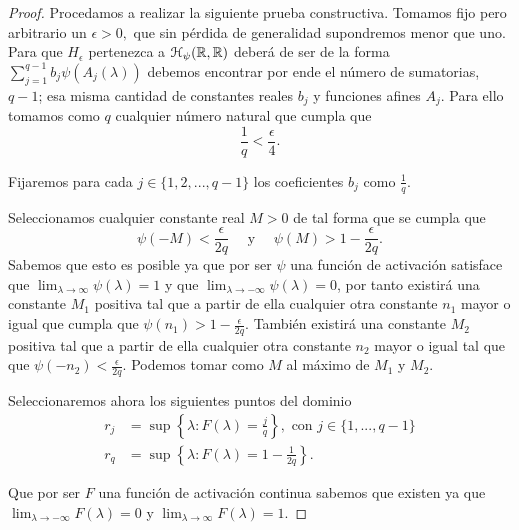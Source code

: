 \begin{proof}
    Procedamos a realizar la siguiente prueba constructiva. 
    Tomamos fijo pero arbitrario un $\epsilon > 0,$ que sin pérdida de generalidad
    supondremos menor que uno.
    Para que $H_\epsilon$ pertenezca a $\mathcal{H}_\psi{(\mathbb{R}, \mathbb{R})}$ deberá de ser de la 
    forma $\sum^{q-1}_{j=1} b_j \psi( A_j(\lambda))$
    debemos encontrar por ende el número de sumatorias, $q-1$; esa misma cantidad de constantes reales $b_j$ y 
    funciones afines $A_j$. Para ello tomamos como $q$ cualquier número natural que cumpla que 
    \begin{equation}\label{eq:lema_a_2_def_q}
        \frac{1}{q} < \frac{\epsilon}{4}.
    \end{equation}

    Fijaremos para cada $j \in \{1,2, ...,q-1\}$ los coeficientes  $b_j$ como $\frac{1}{q}$. 

    Seleccionamos cualquier constante real $M>0$ de tal forma que 
    se cumpla que
    \begin{equation}\label{lema_a_2_psi_m}
        \psi(-M) < \frac{\epsilon}{2q}
        \quad \text{ y } \quad
        \psi(M) > 1 - \frac{\epsilon}{2q}.
    \end{equation} 
    Sabemos que esto es posible ya que por ser $\psi$ una función de activación satisface que 
    $\lim_{\lambda \longrightarrow \infty} \psi(\lambda) = 1$ y que  $\lim_{\lambda \longrightarrow -\infty} \psi(\lambda) = 0$,
    por tanto existirá una constante $M_1$ positiva tal que a partir de ella cualquier
     otra constante $n_1$ mayor o igual que cumpla que 
    $\psi(n_1) > 1 - \frac{\epsilon}{2q}$. También existirá una constante $M_2$ positiva tal que a partir de 
    ella cualquier otra constante $n_2$ mayor o igual tal que que 
    $\psi(-n_2) < \frac{\epsilon}{2q}$. Podemos tomar como $M$ al máximo de $M_1$ y $M_2$.   

    Seleccionaremos ahora los siguientes puntos del dominio
    \begin{align}\label{lema:2_2_selección_r_F}
        r_j &= \sup \left\{ \lambda: F(\lambda) = \frac{j}{q} \right\},
         \text{ con } j \in \{1, ..., q-1\} 
         \\
        r_q &= \sup \left\{ \lambda: F(\lambda) = 1 - \frac{1}{2 q} \right\}. 
    \end{align}

    Que por ser $F$ una función de activación continua 
    sabemos que existen
    ya que $\lim_{\lambda \longrightarrow - \infty} F(\lambda) = 0$ y 
    $\lim_{\lambda \longrightarrow  \infty} F(\lambda) = 1$. 


\end{proof}
